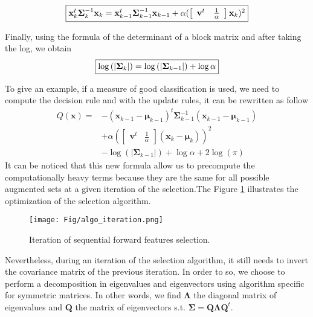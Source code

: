 \documentclass[a4paper]{article}
\begin{document}
        \begin{equation}
            \fbox{$\mathbf{x}_{k}^t \boldsymbol{\Sigma}_{k}^{-1} \mathbf{x}_{k} = \mathbf{x}_{k-1}^t \boldsymbol{\Sigma}_{k-1}^{-1} \mathbf{x}_{k-1} + \alpha ( \left[\begin{array}{cc} \mathbf{v}^t & \frac{1}{\alpha} \end{array}\right] \mathbf{x}_k )^2$}
        \end{equation}

        Finally, using the formula of the determinant of a block matrix and after taking the log, we obtain
        \begin{equation}
            \fbox{$\log \left(|\boldsymbol{\Sigma}_k|\right) = \log \left(|\boldsymbol{\Sigma}_{k-1}|\right) + \log \alpha$}
        \end{equation}

        To give an example, if a measure of good classification is used, we need to compute the decision rule and with the update rules, it can be rewritten as follow
        \begin{align*}
            Q(\mathbf{x}) = &- (\mathbf{x}_{k-1} - \boldsymbol{\mu}_{k-1})^t \boldsymbol{\Sigma}_{k-1}^{-1} (\mathbf{x}_{k-1} - \boldsymbol{\mu}_{k-1}) \\
            &+ \alpha ( \left[\begin{array}{cc} \mathbf{v}^t & \frac{1}{\alpha} \end{array}\right] (\mathbf{x}_k - \boldsymbol{\mu}_k) )^2 \\
            &- \log \left(|\boldsymbol{\Sigma}_{k-1}|\right) + \log \alpha  + 2 \log (\pi)
        \end{align*}
        It can be noticed that this new formula allow us to precompute the computationally heavy terms because they are the same for all possible augmented sets at a given iteration of the selection.The Figure \ref{fig:opt_computation} illustrates the optimization of the selection algorithm.

        \begin{figure}[!ht]
            \centering
            \setlength{\tabcolsep}{2pt}
            \texttt{[image: Fig/algo\_iteration.png]}
            \caption{Iteration of sequential forward features selection.\label{fig:opt_computation}}
        \end{figure}

        Nevertheless, during an iteration of the selection algorithm, it still needs to invert the covariance matrix of the previous iteration. In order to so, we choose to perform a decomposition in eigenvalues and eigenvectors using algorithm specific for symmetric matrices. In other words, we find $\boldsymbol{\Lambda}$ the diagonal matrix of eigenvalues and $\mathbf{Q}$ the matrix of eigenvectors s.t. $\boldsymbol{\Sigma} = \mathbf{Q} \boldsymbol{\Lambda} \mathbf{Q}^t$.
\end{document}

